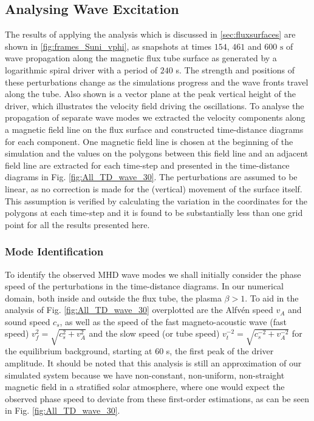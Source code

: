\subsection{Analysing Wave Excitation}\label{sec:driveranalysis}
The results of applying the analysis which is discussed in \cref{sec:fluxsurfaces} are shown in \cref{fig:frames_Suni_vphi}, as snapshots at times $154$, $461$ and $600 \text{ s}$ of wave propagation along the magnetic flux tube surface as generated by a logarithmic spiral driver with a period of $240$ s.
The strength and positions of these perturbations change as the simulations progress and the wave fronts travel along the tube. 
Also shown is a vector plane at the peak vertical height of the driver, which illustrates the velocity field driving the oscillations.
To analyse the propagation of separate wave modes we extracted the velocity components along a magnetic field line on the flux surface and constructed time-distance diagrams for each component. 
One magnetic field line is chosen at the beginning of the simulation and the values on the polygons between this field line and an adjacent field line are extracted for each time-step and presented in the time-distance diagrams in Fig. \ref{fig:All_TD_wave_30}. 
The perturbations are assumed to be linear, as no correction is made for the (vertical) movement of the surface itself. 
This assumption is verified by calculating the variation in the coordinates for the polygons at each time-step and it is found to be substantially less than one grid point for all the results presented here.


\subsubsection{Mode Identification}
To identify the observed MHD wave modes we shall initially consider the phase speed of the perturbations in the time-distance diagrams. 
In our numerical domain, both inside and outside the flux tube, the plasma $\beta > 1$.
To aid in the analysis of Fig. \ref{fig:All_TD_wave_30} overplotted are the Alfv\'en speed $v_A$ and sound speed $c_s$, as well as the speed of the fast magneto-acoustic wave (fast speed) $v_f^2 = \sqrt{c_s^2 + v_A^2}$ and the slow speed (or tube speed) $v_t^{-2} = \sqrt{c_s^{-2} + v_A^{-2}}$ for the equilibrium background, starting at $60$ s, the first peak of the driver amplitude. 
It should be noted that this analysis is still an approximation of our simulated system because we have non-constant, non-uniform, non-straight magnetic field in a stratified solar atmosphere, where one would expect the observed phase speed to deviate from these first-order estimations, as can be seen in Fig. \ref{fig:All_TD_wave_30}.

